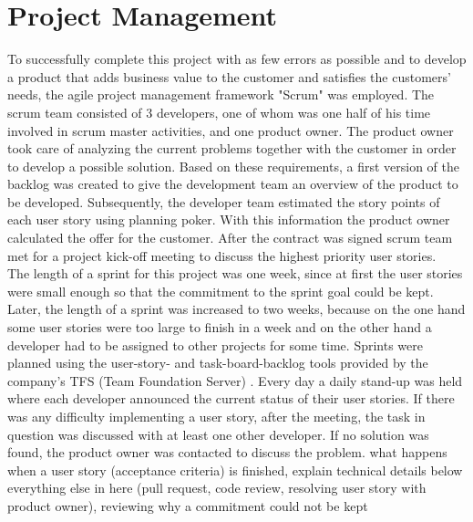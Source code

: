 \documentclass[Bachelor,BIF,english]{twbook}
\begin{document}
\section{Project Management}
To successfully complete this project with as few errors as possible and to develop a product that adds business value to the customer and satisfies the customers' needs, the agile project management framework "Scrum" \cite{Scrum} was employed. The scrum team consisted of 3 developers, one of whom was one half of his time involved in scrum master activities, and one product owner. The product owner took care of analyzing the current problems together with the customer in order to develop a possible solution. Based on these requirements, a first version of the backlog was created to give the development team an overview of the product to be developed. Subsequently, the developer team estimated the story points of each user story using planning poker. With this information the product owner calculated the offer for the customer. After the contract was signed scrum team met for a project kick-off meeting to discuss the highest priority user stories.
\\[\baselineskip]
The length of a sprint for this project was one week, since at first the user stories were small enough so that the commitment to the sprint goal could be kept. Later, the length of a sprint was increased to two weeks, because on the one hand some user stories were too large to finish in a week and on the other hand a developer had to be assigned to other projects for some time. Sprints were planned using the user-story- and task-board-backlog tools provided by the company's TFS (Team Foundation Server) \cite{TFS}.
Every day a daily stand-up was held where each developer announced the current status of their user stories. If there was any difficulty implementing a user story, after the meeting, the task in question was discussed with at least one other developer. If no solution was found, the product owner was contacted to discuss the problem.
what happens when a user story (acceptance criteria) is finished, explain technical details below everything else in here (pull request, code review, resolving user story with product owner), reviewing why a commitment could not be kept 
\end{document}

